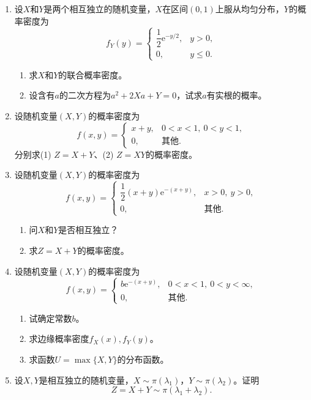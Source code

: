 \documentclass[UTF8]{ctexart}
\begin{document}
\begin{enumerate}
\item 设$X$和$Y$是两个相互独立的随机变量，$X$在区间$(0,1)$上服从均匀分布，$Y$的概率密度为
\[
f_{Y}(y)=
\begin{cases}
\dfrac{1}{2}\mathrm{e}^{-y/2}, & y>0,\\[6pt]
0, & y\le 0.
\end{cases}
\]
\begin{enumerate}
\item[(1)] 求$X$和$Y$的联合概率密度。
\item[(2)] 设含有$a$的二次方程为$a^{2}+2Xa+Y=0$，试求$a$有实根的概率。
\end{enumerate}

\setcounter{enumi}{20}
\item 设随机变量$(X,Y)$的概率密度为
\[
f(x,y)=
\begin{cases}
x+y, & 0<x<1,\ 0<y<1,\\[4pt]
0, & \text{其他}.
\end{cases}
\]
分别求(1) $Z=X+Y$、(2) $Z=XY$的概率密度。

\setcounter{enumi}{23}
\item 设随机变量$(X,Y)$的概率密度为
\[
f(x,y)=
\begin{cases}
\dfrac{1}{2}(x+y)\mathrm{e}^{-(x+y)}, & x>0,\ y>0,\\[6pt]
0, & \text{其他}.
\end{cases}
\]
\begin{enumerate}
\item[(1)] 问$X$和$Y$是否相互独立？
\item[(2)] 求$Z=X+Y$的概率密度。
\end{enumerate}

\setcounter{enumi}{28}
\item 设随机变量$(X,Y)$的概率密度为
\[
f(x,y)=
\begin{cases}
b\mathrm{e}^{-(x+y)}, & 0<x<1,\ 0<y<\infty,\\[4pt]
0, & \text{其他}.
\end{cases}
\]
\begin{enumerate}
\item[(1)] 试确定常数$b$。
\item[(2)] 求边缘概率密度$f_{X}(x),f_{Y}(y)$。
\item[(3)] 求函数$U=\max\{X,Y\}$的分布函数。
\end{enumerate}

\setcounter{enumi}{33}
\item 设$X,Y$是相互独立的随机变量，$X\sim \pi(\lambda_{1})$，$Y\sim \pi(\lambda_{2})$。证明
\[
Z=X+Y\sim \pi(\lambda_{1}+\lambda_{2}).
\]
\end{enumerate}
\end{document}
